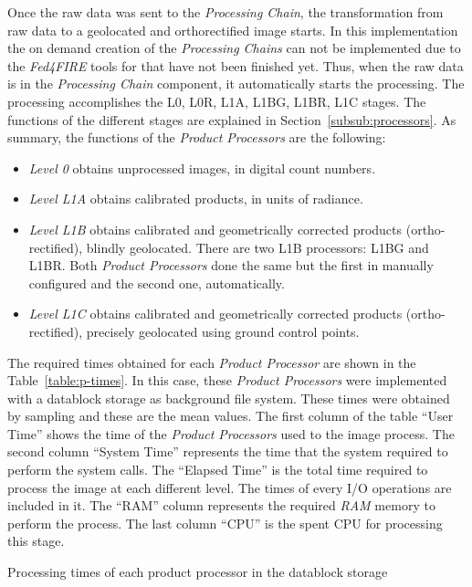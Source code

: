 Once the raw data was sent to the \emph{Processing Chain}, the transformation from
raw data to a geolocated and orthorectified image starts. In this implementation the
on demand creation of the \emph{Processing Chains} can not be implemented due to
the \emph{Fed4FIRE} tools for that have not been finished yet.
Thus, when the raw data is in  the \emph{Processing Chain} component, it automatically starts the processing. The processing accomplishes the L0, L0R,
L1A, L1BG, L1BR, L1C stages. 
The functions of the different stages are explained
in Section~\ref{subsub:processors}. As summary, the functions of the
\emph{Product Processors} are the following:
\begin{itemize}
\item \emph{Level 0} obtains unprocessed images, in digital count numbers.
\item \emph{Level L1A} obtains calibrated products, in units of radiance.
\item \emph{Level L1B} obtains calibrated and geometrically corrected products
  (ortho-rectified), blindly geolocated. There are two L1B processors: L1BG and
  L1BR. Both \emph{Product Processors} done the same but the first in manually
  configured and the second one, automatically.
\item \emph{Level L1C} obtains calibrated and geometrically corrected products (ortho-rectified), precisely geolocated using ground control points.
\end{itemize}


The required times obtained for
each \emph{Product Processor} are shown in the Table~\ref{table:p-times}. In
this case, these \emph{Product Processors} were implemented with a datablock
storage as background file system. These
times were obtained by sampling and these are the mean values. The first column of the table ``User Time'' shows the  time of the
\emph{Product Processors} used to the image process. The second column ``System
Time'' represents the time that the system required to perform the system calls. The ``Elapsed Time'' is
the total time required to process the image at each different level. The times of every I/O operations are
included in it. The ``RAM'' column represents the required \emph{RAM} memory to
perform the process. The last column ``CPU'' is the spent \ac{CPU} for
processing this stage.

\begin{table}[!h]
  \centering
  {\small
  
  }
  \caption{Processing times of each product processor in the datablock storage}
  \label{table:p-times}
\end{table}

